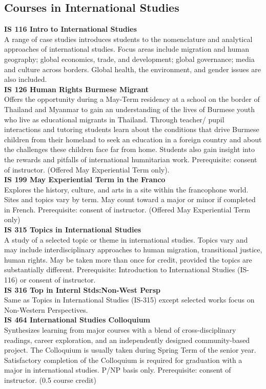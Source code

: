 \documentclass[
  letterpaper,
]{scrbook}
\begin{document}
\subsection{Courses in International
Studies}\label{courses-in-international-studies}

\textbf{IS 116 Intro to International Studies}\\
A range of case studies introduces students to the nomenclature and
analytical approaches of international studies. Focus areas include
migration and human geography; global economics, trade, and development;
global governance; media and culture across borders. Global health, the
environment, and gender issues are also included.\\
\textbf{IS 126 Human Rights Burmese Migrant}\\
Offers the opportunity during a May-Term residency at a school on the
border of Thailand and Myanmar to gain an understanding of the lives of
Burmese youth who live as educational migrants in Thailand. Through
teacher/ pupil interactions and tutoring students learn about the
conditions that drive Burmese children from their homeland to seek an
education in a foreign country and about the challenges these children
face far from home. Students also gain insight into the rewards and
pitfalls of international humnitarian work. Prerequisite: consent of
instructor. (Offered May Experiential Term only).\\
\textbf{IS 199 May Experiential Term in the Franco}\\
Explores the history, culture, and arts in a site within the francophone
world. Sites and topics vary by term. May count toward a major or minor
if completed in French. Prerequisite: consent of instructor. (Offered
May Experiential Term only)\\
\textbf{IS 315 Topics in International Studies}\\
A study of a selected topic or theme in international studies. Topics
vary and may include interdisciplinary approaches to human migration,
transitional justice, human rights. May be taken more than once for
credit, provided the topics are substantially different. Prerequisite:
Introduction to International Studies (IS-116) or consent of
instructor.\\
\textbf{IS 316 Top in Internl Stds:Non-West Persp}\\
Same as Topics in International Studies (IS-315) except selected works
focus on Non-Western Perspectives.\\
\textbf{IS 464 International Studies Colloquium}\\
Synthesizes learning from major courses with a blend of
cross-disciplinary readings, career exploration, and an independently
designed community-based project. The Colloquium is usually taken during
Spring Term of the senior year. Satisfactory completion of the
Colloquium is required for graduation with a major in international
studies. P/NP basis only. Prerequisite: consent of instructor. (0.5
course credit)
\end{document}
